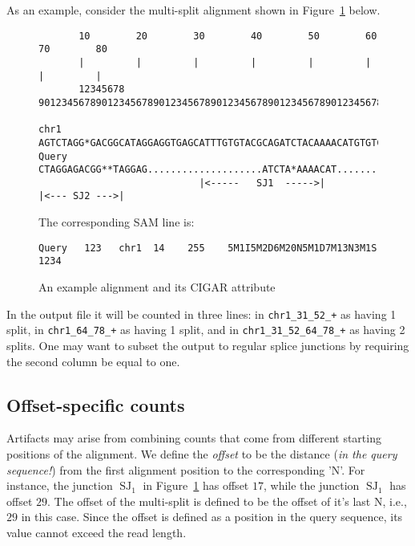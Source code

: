 \documentclass{article}
\DeclareMathOperator{\SJ}{SJ}
\begin{document}
As an example, consider the multi-split alignment shown in Figure~\ref{fig::01} below. 
%
\begin{figure}[h]
\footnotesize
\begin{verbatim}
       10        20        30        40        50        60        70        80
       |         |         |         |         |         |         |         |
       12345678 9012345678901234567890123456789012345678901234567890123456789012

chr1   AGTCTAGG*GACGGCATAGGAGGTGAGCATTTGTGTACGCAGATCTACAAAACATGTGTCACGGATAGGATCG
Query     CTAGGAGACGG**TAGGAG....................ATCTA*AAAACAT.............GATa
                            |<-----   SJ1  ----->|           |<--- SJ2 --->|
\end{verbatim}
The corresponding SAM line is:
\begin{verbatim}
Query   123   chr1  14    255    5M1I5M2D6M20N5M1D7M13N3M1S 1234 
\end{verbatim}
\caption{An example alignment and its CIGAR attribute\label{fig::01}}
\end{figure}
%
In the output file it will be counted in three lines: in {\tt chr1\_31\_52\_+} as having 1 split, 
in {\tt chr1\_64\_78\_+} as having 1 split, and in {\tt chr1\_31\_52\_64\_78\_+} as having 2 splits.
One may want to subset the output to regular splice junctions by requiring the second column be 
equal to one.

\subsection{Offset-specific counts}
Artifacts may arise from combining counts that come from different starting positions of the alignment. We 
define the {\em offset} to be the distance ({\em in the query sequence!}) from the first alignment position 
to the corresponding 'N'. For instance, the junction $\SJ_1$ in Figure~\ref{fig::01} has offset $17$, while
the junction $\SJ_1$ has offset $29$. The offset of the multi-split is defined to be the offset of it's last 
N, i.e., $29$ in this case. Since the offset is defined as a position in the query sequence, its value
cannot exceed the read length.
\end{document}
